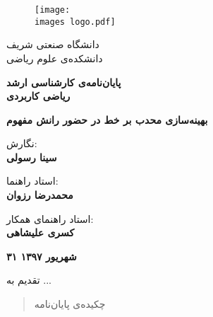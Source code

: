 \documentclass[a4paper,11px]{article}
\begin{document}
\thispagestyle{empty}
\begin{figure}[!hbt]
\centering
\texttt{[image: \\images logo.pdf]}
\centering
\end{figure}

\vspace{-5mm}
\begin{center}
\large
دانشگاه صنعتی شریف\\
دانشکده‌ی علوم ریاضی
\end{center}

\vspace{5mm}
\begin{center}
\large
\textbf{
پایان‌نامه‌ی کارشناسی ارشد\\
ریاضی کاربردی
}
\end{center}


\vspace{5mm}
\begin{center}
\Large
\textbf{
بهینه‌سازی محدب بر خط در حضور رانش مفهوم
}
\end{center}


\vspace{10mm}
\begin{center}
\large
نگارش:
\\
\textbf{
سینا رسولی
}
\end{center}



\vspace{10mm}
\begin{center}
\large
استاد راهنما:
\\
\textbf{
محمدرضا رزوان
}
\end{center}

\vspace{2mm}

\begin{center}
\large
استاد راهنمای همکار:
\\
\textbf{
کسری علیشاهی
}
\end{center}



\vfill
\begin{center}
\Large \textbf{
۳۱ شهریور ۱۳۹۷
}
\end{center}


\newpage


تقدیم به ...

\newpage


\begin{abstract}
چکیده‌ی پایان‌نامه
\end{abstract}
\newpage
\end{document}
